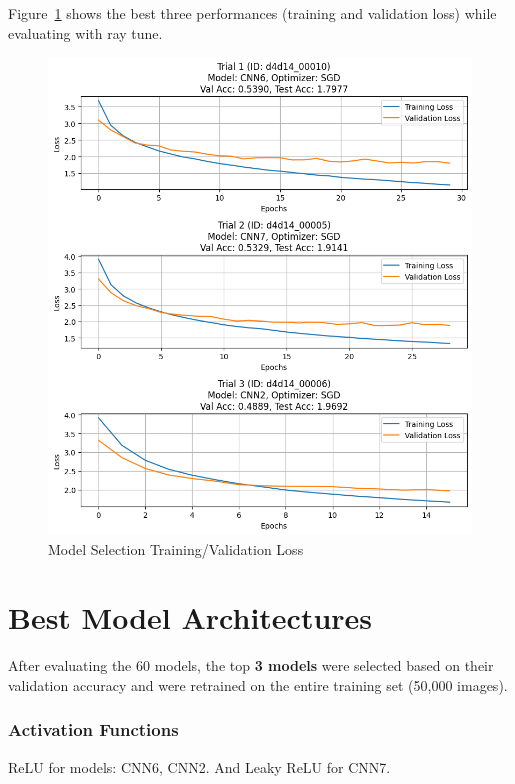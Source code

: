 \documentclass[conference]{IEEEtran}
\begin{document}
Figure~\ref{fig: model selection training/validation loss} shows the best three performances (training and validation loss) while evaluating with ray tune.
\begin{figure}[H]
    \centering
    \includegraphics[width=1\linewidth]{training_plots.png}
    \caption{Model Selection Training/Validation Loss}
    \label{fig: model selection training/validation loss}
\end{figure}


\section{Best Model Architectures} \label{sec: best model architectures}
After evaluating the 60 models, the top \textbf{3 models} were selected based on their validation accuracy and were retrained on the entire training set (50,000 images).


\subsubsection{Activation Functions} ReLU for models: CNN6, CNN2. And Leaky ReLU for CNN7.
\end{document}
